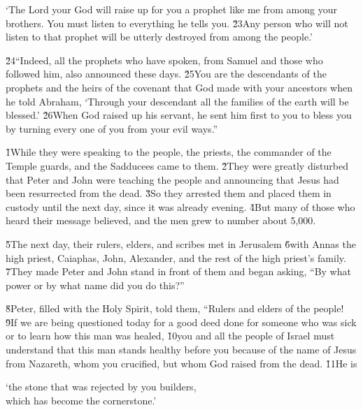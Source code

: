 `The Lord your God will raise up for you a prophet like me from among your brothers. You must listen to everything he tells you. \v{23}Any person who will not listen to that prophet will be utterly destroyed from among the people.'

\v{24}``Indeed, all the prophets who have spoken, from Samuel and those who followed him, also announced these days. \v{25}You are the descendants of the prophets and the heirs of the covenant that God made with your ancestors when he told Abraham, `Through your descendant all the families of the earth will be blessed.' \v{26}When God raised up his servant, he sent him first to you to bless you by turning every one of you from your evil ways.''

\v{1}While they were speaking to the people, the priests, the commander of the Temple guards, and the Sadducees came to them. \v{2}They were greatly disturbed that Peter and John were teaching the people and announcing that Jesus had been resurrected from the dead. \v{3}So they arrested them and placed them in custody until the next day, since it was already evening. \v{4}But many of those who heard their message believed, and the men grew to number about 5,000.

\v{5}The next day, their rulers, elders, and scribes met in Jerusalem \v{6}with Annas the high priest, Caiaphas, John, Alexander, and the rest of the high priest's family. \v{7}They made Peter and John stand in front of them and began asking, ``By what power or by what name did you do this?''

\v{8}Peter, filled with the Holy Spirit, told them, ``Rulers and elders of the people! \v{9}If we are being questioned today for a good deed done for someone who was sick or to learn how this man was healed, \v{10}you and all the people of Israel must understand that this man stands healthy before you because of the name of Jesus from Nazareth, whom you crucified, but whom God raised from the dead. \v{11}He is

\begin{poetry}
\poeml `the stone that was rejected by you builders, \\
\poemll    which has become the cornerstone.'
\end{poetry}

